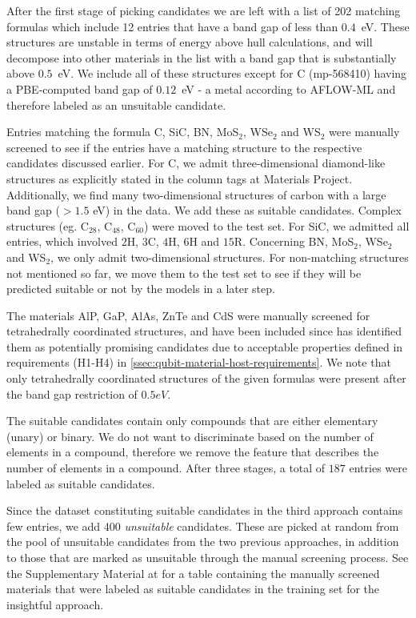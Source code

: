 \documentclass[superscriptaddress,unsortedaddress,
 amsmath,amssymb,
 aps,
]{revtex4-2}
\begin{document}
After the first stage of picking candidates we are left with a list of 202 matching formulas which include 12 entries that have a band gap of less than $0.4$~eV. These structures are unstable in terms of energy above hull calculations, and will decompose into other materials in the list with a band gap that is substantially above $0.5$~eV. We include all of these structures except for C (mp-568410) having a PBE-computed band gap of $0.12$~eV - a metal according to AFLOW-ML and therefore labeled as an unsuitable candidate. 
 
Entries matching the formula C, SiC, BN, MoS$_2$, WSe$_2$ and WS$_2$ were manually screened to see if the entries have a matching structure to the respective candidates discussed earlier. %
For C, we admit three-dimensional diamond-like structures as explicitly stated in the column tags at Materials Project. Additionally, we find many two-dimensional structures of carbon with a large band gap ($>1.5$ eV) in the data. We add these as suitable candidates. Complex structures (eg. C$_{28}$, C$_{48}$, C$_{60}$) were moved to the test set. For SiC, we admitted all entries, which involved $2$H, $3$C, $4$H, $6$H and $15$R. Concerning BN, MoS$_2$, WSe$_2$ and  WS$_2$, we only admit two-dimensional structures. For non-matching structures not mentioned so far, we move them to the test set to see if they will be predicted suitable or not by the models in a later step.

The materials AlP, GaP, AlAs, ZnTe and CdS were manually screened for tetrahedrally coordinated structures, and have been included since \citeauthor{Weber2010} \cite{Weber2010} has identified them as potentially promising candidates due to acceptable properties defined in requirements (H1-H4) in \autoref{ssec:qubit-material-host-requirements}. We note that only tetrahedrally coordinated structures of the given formulas were present after the band gap restriction of $0.5eV$.

The suitable candidates contain only compounds that are either elementary (unary) or binary. We do not want to discriminate based on the number of elements in a compound, therefore we remove the feature that describes the number of elements in a compound. After three stages, a total of $187$ entries were labeled as suitable candidates.

Since the dataset constituting suitable candidates in the third approach contains few entries, we add 400 \emph{unsuitable}
candidates. These are picked at random from the pool of unsuitable candidates 
from the two previous approaches, in addition to those that are marked as unsuitable through
the manual screening process. 
See the Supplementary Material at \cite{supplementary} for a table containing the manually screened materials that were labeled as suitable candidates in the training set for the insightful approach. 
\end{document}
